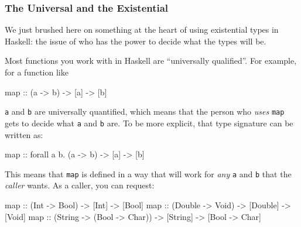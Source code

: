 \documentclass[]{article}
\newenvironment{Shaded}{}{}
\newcommand{\DataTypeTok}[1]{\textcolor[rgb]{0.56,0.13,0.00}{{#1}}}
\newcommand{\OtherTok}[1]{\textcolor[rgb]{0.00,0.44,0.13}{{#1}}}
\newcommand{\FunctionTok}[1]{\textcolor[rgb]{0.02,0.16,0.49}{{#1}}}
\newcommand{\NormalTok}[1]{{#1}}
\begin{document}
\subsubsection{The Universal and the
Existential}\label{the-universal-and-the-existential}

We just brushed here on something at the heart of using existential types in
Haskell: the issue of who has the power to decide what the types will be.

Most functions you work with in Haskell are ``universally qualified''. For
example, for a function like

\begin{Shaded}
\begin{Highlighting}[]
\NormalTok{map}\OtherTok{ ::} \NormalTok{(a }\OtherTok{->} \NormalTok{b) }\OtherTok{->} \NormalTok{[a] }\OtherTok{->} \NormalTok{[b]}
\end{Highlighting}
\end{Shaded}

\texttt{a} and \texttt{b} are universally quantified, which means that the
person who \emph{uses} \texttt{map} gets to decide what \texttt{a} and
\texttt{b} are. To be more explicit, that type signature can be written as:

\begin{Shaded}
\begin{Highlighting}[]
\NormalTok{map}\OtherTok{ ::} \NormalTok{forall a b}\FunctionTok{.} \NormalTok{(a }\OtherTok{->} \NormalTok{b) }\OtherTok{->} \NormalTok{[a] }\OtherTok{->} \NormalTok{[b]}
\end{Highlighting}
\end{Shaded}

This means that \texttt{map} is defined in a way that will work for \emph{any}
\texttt{a} and \texttt{b} that the \emph{caller} wants. As a caller, you can
request:

\begin{Shaded}
\begin{Highlighting}[]
\NormalTok{map}\OtherTok{ ::} \NormalTok{(}\DataTypeTok{Int} \OtherTok{->} \DataTypeTok{Bool}\NormalTok{)    }\OtherTok{->} \NormalTok{[}\DataTypeTok{Int}\NormalTok{]    }\OtherTok{->} \NormalTok{[}\DataTypeTok{Bool}\NormalTok{]}
\NormalTok{map}\OtherTok{ ::} \NormalTok{(}\DataTypeTok{Double} \OtherTok{->} \DataTypeTok{Void}\NormalTok{) }\OtherTok{->} \NormalTok{[}\DataTypeTok{Double}\NormalTok{] }\OtherTok{->} \NormalTok{[}\DataTypeTok{Void}\NormalTok{]}
\NormalTok{map}\OtherTok{ ::} \NormalTok{(}\DataTypeTok{String} \OtherTok{->} \NormalTok{(}\DataTypeTok{Bool} \OtherTok{->} \DataTypeTok{Char}\NormalTok{)) }\OtherTok{->} \NormalTok{[}\DataTypeTok{String}\NormalTok{] }\OtherTok{->} \NormalTok{[}\DataTypeTok{Bool} \OtherTok{->} \DataTypeTok{Char}\NormalTok{]}
\end{Highlighting}
\end{Shaded}
\end{document}
